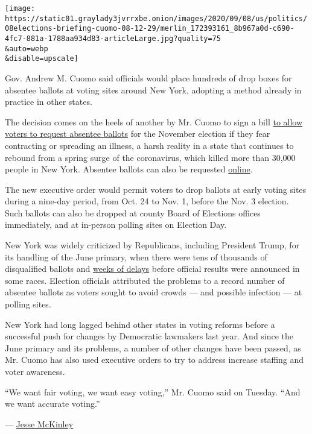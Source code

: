 \texttt{[image: https://static01.graylady3jvrrxbe.onion/images/2020/09/08/us/politics/08elections-briefing-cuomo-08-12-29/merlin\_172393161\_8b967a0d-c690-4fc7-881a-1788aa934d83-articleLarge.jpg?quality=75\\\&auto=webp\\\&disable=upscale]}

Gov. Andrew M. Cuomo said officials would place hundreds of drop boxes
for absentee ballots at voting sites around New York, adopting a method
already in practice in other states.

The decision comes on the heels of another by Mr. Cuomo to sign a bill
\href{https://www.nytimes3xbfgragh.onion/2020/08/20/nyregion/vote-by-mail-new-york.html?searchResultPosition=4}{to
allow voters to request absentee ballots} for the November election if
they fear contracting or spreading an illness, a harsh reality in a
state that continues to rebound from a spring surge of the coronavirus,
which killed more than 30,000 people in New York. Absentee ballots can
also be requested
\href{https://absenteeballot.elections.ny.gov/Home/Search?aspxerrorpath=/\%e2\%80\%8b}{online}.

The new executive order would permit voters to drop ballots at early
voting sites during a nine-day period, from Oct. 24 to Nov. 1, before
the Nov. 3 election. Such ballots can also be dropped at county Board of
Elections offices immediately, and at in-person polling sites on
Election Day.

New York was widely criticized by Republicans, including President
Trump, for its handling of the June primary, when there were tens of
thousands of disqualified ballots and
\href{https://www.nytimes3xbfgragh.onion/2020/07/17/nyregion/election-absentee-ballots-primary.html}{weeks
of delays} before official results were announced in some races.
Election officials attributed the problems to a record number of
absentee ballots as voters sought to avoid crowds --- and possible
infection --- at polling sites.

New York had long lagged behind other states in voting reforms before a
successful push for changes by Democratic lawmakers last year. And since
the June primary and its problems, a number of other changes have been
passed, as Mr. Cuomo has also used executive orders to try to address
increase staffing and voter awareness.

``We want fair voting, we want easy voting,'' Mr. Cuomo said on Tuesday.
``And we want accurate voting.''

--- \href{https://www.nytimes3xbfgragh.onion/by/jesse-mckinley}{Jesse
McKinley}

